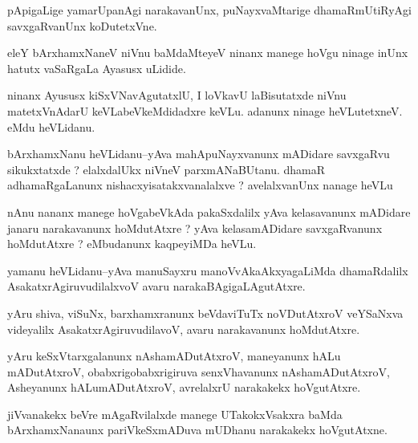 \documentclass{article}
\begin{document}
\begin{mn}%
pApigaLige yamarUpanAgi narakavanUnx, puNayxvaMtarige dhamaRmUtiRyAgi savxgaRvanUnx 
koDutetxVne.
\end{mn}

\begin{mn}%
eleY bArxhamxNaneV niVnu baMdaMteyeV ninanx manege hoVgu ninage inUnx hatutx vaSaRgaLa 
Ayasusx uLidide.
\end{mn}

\begin{mn}%
ninanx Ayususx kiSxVNavAgutatxlU, I loVkavU laBisutatxde niVnu matetxVnAdarU 
keVLabeVkeMdidadxre keVLu. adanunx ninage heVLutetxneV. eMdu heVLidanu.
\end{mn}


\begin{mn}%
bArxhamxNanu heVLidanu--yAva mahApuNayxvanunx mADidare savxgaRvu sikukxtatxde ? 
elalxdalUkx niVneV parxmANaBUtanu. dhamaR adhamaRgaLanunx nishacxyisatakxvanalalxve ? 
avelalxvanUnx nanage heVLu
\end{mn}

\begin{mn}%
nAnu nananx manege hoVgabeVkAda pakaSxdalilx yAva kelasavanunx mADidare janaru 
narakavanunx hoMdutAtxre ? yAva kelasamADidare savxgaRvanunx hoMdutAtxre ? eMbudanunx 
kaqpeyiMDa heVLu.
\end{mn}

\begin{mn}%
yamanu heVLidanu--yAva manuSayxru manoVvAkaAkxyagaLiMda dhamaRdalilx 
AsakatxrAgiruvudilalxvoV avaru narakaBAgigaLAgutAtxre.
\end{mn}

\begin{mn}%
yAru shiva, viSuNx, barxhamxranunx beVdaviTuTx noVDutAtxroV veYSaNxva videyalilx 
AsakatxrAgiruvudilavoV, avaru narakavanunx hoMdutAtxre.
\end{mn}

\begin{mn}%
yAru keSxVtarxgalanunx nAshamADutAtxroV, maneyanunx hALu mADutAtxroV, 
obabxrigobabxrigiruva senxVhavanunx nAshamADutAtxroV, Asheyanunx hALumADutAtxroV, 
avrelalxrU narakakekx hoVgutAtxre.
\end{mn}

\begin{mn}%
jiVvanakekx beVre mAgaRvilalxde manege UTakokxVsakxra baMda bArxhamxNanaunx 
pariVkeSxmADuva mUDhanu narakakekx hoVgutAtxne.
\end{mn}
\end{document}
